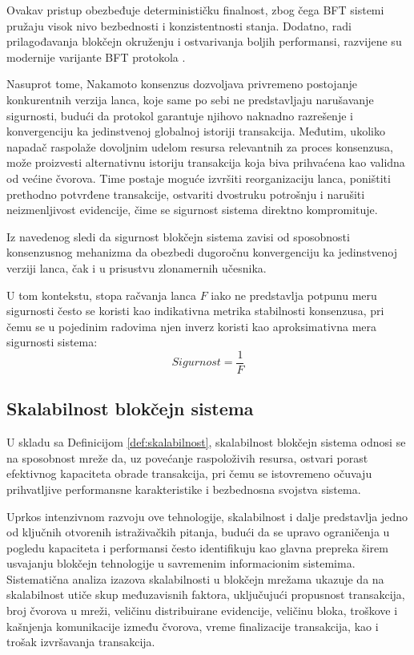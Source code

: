 Ovakav pristup obezbeđuje determinističku finalnost, zbog čega BFT sistemi pružaju visok nivo bezbednosti i konzistentnosti stanja. Dodatno, radi prilagođavanja blokčejn okruženju i ostvarivanja boljih performansi, razvijene su modernije varijante BFT protokola \cite{alqahtani2021bottlenecks}.

Nasuprot tome, Nakamoto konsenzus dozvoljava privremeno postojanje konkurentnih verzija lanca, koje same po sebi ne predstavljaju narušavanje sigurnosti, budući da protokol garantuje njihovo naknadno razrešenje i konvergenciju ka jedinstvenoj globalnoj istoriji transakcija. Međutim, ukoliko napadač raspolaže dovoljnim udelom resursa relevantnih za proces konsenzusa, može proizvesti alternativnu istoriju transakcija koja biva prihvaćena kao validna od većine čvorova. Time postaje moguće izvršiti reorganizaciju lanca, poništiti prethodno potvrđene transakcije, ostvariti dvostruku potrošnju i narušiti neizmenljivost evidencije, čime se sigurnost sistema direktno kompromituje.

Iz navedenog sledi da sigurnost blokčejn sistema zavisi od sposobnosti konsenzusnog mehanizma da obezbedi dugoročnu konvergenciju ka jedinstvenoj verziji lanca, čak i u prisustvu zlonamernih učesnika.

U tom kontekstu, stopa račvanja lanca $F$ iako ne predstavlja potpunu meru sigurnosti često se koristi kao indikativna metrika stabilnosti konsenzusa, pri čemu se u pojedinim radovima \cite{nakai2023blockchain} njen inverz koristi kao aproksimativna mera sigurnosti sistema:
$$ Sigurnost = \frac{1}{F} $$

\subsection{Skalabilnost blokčejn sistema}
U skladu sa Definicijom \ref{def:skalabilnost}, skalabilnost blokčejn sistema odnosi se na sposobnost mreže da, uz povećanje raspoloživih resursa, ostvari porast efektivnog kapaciteta obrade transakcija, pri čemu se istovremeno očuvaju prihvatljive performansne karakteristike i bezbednosna svojstva sistema.

Uprkos intenzivnom razvoju ove tehnologije, skalabilnost i dalje predstavlja jedno od ključnih otvorenih istraživačkih pitanja, budući da se upravo ograničenja u pogledu kapaciteta i performansi često identifikuju kao glavna prepreka širem usvajanju blokčejn tehnologije u savremenim informacionim sistemima. Sistematična analiza izazova skalabilnosti u blokčejn mrežama \cite{khan2021systematic} ukazuje da na skalabilnost utiče skup međuzavisnih faktora, uključujući propusnost transakcija, broj čvorova u mreži, veličinu distribuirane evidencije, veličinu bloka, troškove i kašnjenja komunikacije između čvorova, vreme finalizacije transakcija, kao i trošak izvršavanja transakcija.

